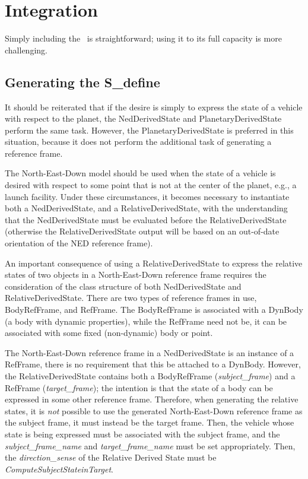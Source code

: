 %
%
% 
%

 \section{Integration}

Simply including the \NEDDesc\ is straightforward; using it to its full capacity is more challenging.

\subsection{Generating the S\_define}

It should be reiterated that if the desire is simply to express the state of a vehicle with respect to the planet, the NedDerivedState and PlanetaryDerivedState perform the same task.  However, the PlanetaryDerivedState is preferred in this situation, because it does not perform the additional task of generating a reference frame.

The North-East-Down model should be used when the state of a vehicle is desired with respect to some point that is not at the center of the planet, e.g., a launch facility.  Under these circumstances, it becomes necessary to instantiate both a NedDerivedState, and a RelativeDerivedState, with the understanding that the NedDerivedState must be evaluated before the RelativeDerivedState (otherwise the RelativeDerivedState output will be based on an out-of-date orientation of the NED reference frame).

An important consequence of using a RelativeDerivedState to express the relative states of two objects in a North-East-Down reference frame requires the consideration of the class structure of both NedDerivedState and RelativeDerivedState.  There are two types of reference frames in use, BodyRefFrame, and RefFrame.  The BodyRefFrame is associated with a DynBody (a body with dynamic properties), while the RefFrame need not be, it can be associated with some fixed (non-dynamic) body or point.

The North-East-Down reference frame in a NedDerivedState is an instance of a RefFrame, there is no requirement that this be attached to a DynBody.  However, the RelativeDerivedState contains both a BodyRefFrame (\textit{subject\_frame}) and a RefFrame (\textit{target\_frame}); the intention is that the state of a body can be expressed in some other reference frame. Therefore, when generating the relative states, it is \textit{not} possible to use the generated North-East-Down reference frame as the subject frame, it must instead be the target frame.  Then, the vehicle whose state is being expressed must be associated with the subject frame, and the \textit{subject\_frame\_name} and \textit{target\_frame\_name} must be set appropriately.  Then, the \textit{direction\_sense} of the Relative Derived State must be \textit{ComputeSubjectStateinTarget}.

